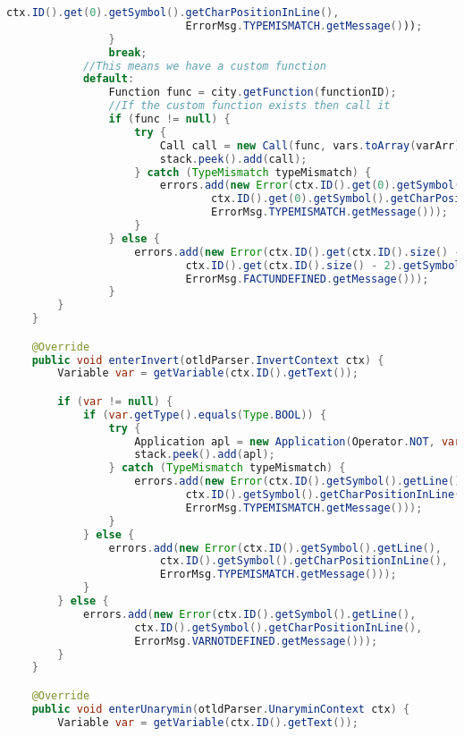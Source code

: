 \begin{landscape}
\begin{lstlisting}[language=Java]
                            ctx.ID().get(0).getSymbol().getCharPositionInLine(),
                            ErrorMsg.TYPEMISMATCH.getMessage()));
                }
                break;
            //This means we have a custom function
            default:
                Function func = city.getFunction(functionID);
                //If the custom function exists then call it
                if (func != null) {
                    try {
                        Call call = new Call(func, vars.toArray(varArr));
                        stack.peek().add(call);
                    } catch (TypeMismatch typeMismatch) {
                        errors.add(new Error(ctx.ID().get(0).getSymbol().getLine(),
                                ctx.ID().get(0).getSymbol().getCharPositionInLine(),
                                ErrorMsg.TYPEMISMATCH.getMessage()));
                    }
                } else {
                    errors.add(new Error(ctx.ID().get(ctx.ID().size() - 2).getSymbol().getLine(),
                            ctx.ID().get(ctx.ID().size() - 2).getSymbol().getCharPositionInLine(),
                            ErrorMsg.FACTUNDEFINED.getMessage()));
                }
        }
    }

    @Override
    public void enterInvert(otldParser.InvertContext ctx) {
        Variable var = getVariable(ctx.ID().getText());

        if (var != null) {
            if (var.getType().equals(Type.BOOL)) {
                try {
                    Application apl = new Application(Operator.NOT, var, var);
                    stack.peek().add(apl);
                } catch (TypeMismatch typeMismatch) {
                    errors.add(new Error(ctx.ID().getSymbol().getLine(),
                            ctx.ID().getSymbol().getCharPositionInLine(),
                            ErrorMsg.TYPEMISMATCH.getMessage()));
                }
            } else {
                errors.add(new Error(ctx.ID().getSymbol().getLine(),
                        ctx.ID().getSymbol().getCharPositionInLine(),
                        ErrorMsg.TYPEMISMATCH.getMessage()));
            }
        } else {
            errors.add(new Error(ctx.ID().getSymbol().getLine(),
                    ctx.ID().getSymbol().getCharPositionInLine(),
                    ErrorMsg.VARNOTDEFINED.getMessage()));
        }
    }

    @Override
    public void enterUnarymin(otldParser.UnaryminContext ctx) {
        Variable var = getVariable(ctx.ID().getText());


\end{lstlisting}
\end{landscape}
